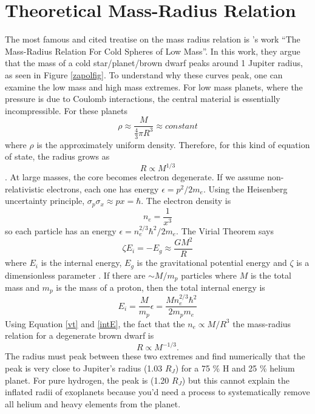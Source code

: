 \documentclass[twocolumn]{emulateapj}
\begin{document}
\section{Theoretical Mass-Radius Relation}
The most famous and cited treatise on the mass radius relation is
\citet{zapolsky}'s work ``The Mass-Radius Relation For Cold Spheres of
Low Mass''. In this work, they argue that the mass of a cold
star/planet/brown dwarf peaks around 1 Jupiter radius, as seen in
Figure \ref{zapolfig}. To understand why these curves peak, one can
examine the low mass and high mass extremes. For low mass planets,
where the pressure is due to Coulomb interactions, the central
material is essentially incompressible. For these planets
\begin{equation}
\rho \approx \frac{M}{\frac{4}{3} \pi R^3} \approx constant
\end{equation}
where $\rho$ is the approximately uniform density.
Therefore, for this kind of equation of state, the radius grows as
\begin{equation}
R \propto M^{1/3}
\end{equation}
. At large masses, the core becomes electron degenerate. If we assume
non-relativistic electrons, each one has energy $\epsilon = p^2/2
m_e$. Using the Heisenberg uncertainty principle, $\sigma_p \sigma_x
\approx p x = \hbar$. The electron density is
\begin{equation}
n_e = \frac{1}{x^3}
\end{equation}
so each particle has an energy $\epsilon = n_e^{2/3} \hbar^2 / 2m_e$. The Virial Theorem says
\begin{equation}\label{vt}
\zeta E_i = - E_g \approx \frac{G M^2}{R}
\end{equation}
where $E_i$ is the internal energy, $E_g$ is the gravitational
potential energy and $\zeta$ is a dimensionless parameter
\citep{kippenhahn}. If there are $\sim M/m_p$ particles where $M$ is
the total mass and $m_p$ is the mass of a proton, then the total
internal energy is
\begin{equation} \label{intE}
E_i = \frac{M}{m_p} \epsilon = \frac{M n_e^{2/3} \hbar^2}{2 m_p m_e}
\end{equation}
Using Equation \ref{vt} and \ref{intE}, the fact that the $n_e \propto M/R^3$ the mass-radius relation for a degenerate brown dwarf is 
\begin{equation}\label{degenMR}
R \propto M^{-1/3}.
\end{equation}
The radius must peak between these two extremes and \citep{zapolsky}
find numerically that the peak is very close to Jupiter's radius (1.03
$R_J$) for a 75 \% H and 25 \% helium planet. For pure hydrogen, the
peak is (1.20 $R_J$) but this cannot explain the inflated radii of
exoplanets because you'd need a process to systematically remove all
helium and heavy elements from the planet.
\end{document}
